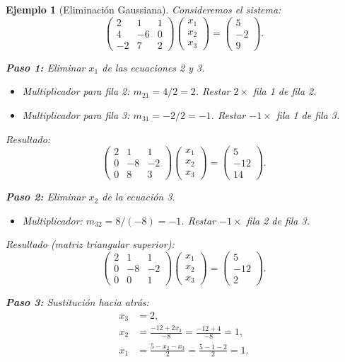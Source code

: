 \documentclass[a4paper,11pt]{report}
\newtheorem{example}[theorem]{Ejemplo}
\begin{document}
\begin{example}[Eliminación Gaussiana]
Consideremos el sistema:
\[
\begin{pmatrix}
2 & 1 & 1 \\
4 & -6 & 0 \\
-2 & 7 & 2
\end{pmatrix}
\begin{pmatrix} x_1 \\ x_2 \\ x_3 \end{pmatrix}
=
\begin{pmatrix} 5 \\ -2 \\ 9 \end{pmatrix}.
\]

\textbf{Paso 1:} Eliminar $x_1$ de las ecuaciones 2 y 3.
\begin{itemize}
\item Multiplicador para fila 2: $m_{21} = 4/2 = 2$. Restar $2 \times$ fila 1 de fila 2.
\item Multiplicador para fila 3: $m_{31} = -2/2 = -1$. Restar $-1 \times$ fila 1 de fila 3.
\end{itemize}
Resultado:
\[
\begin{pmatrix}
2 & 1 & 1 \\
0 & -8 & -2 \\
0 & 8 & 3
\end{pmatrix}
\begin{pmatrix} x_1 \\ x_2 \\ x_3 \end{pmatrix}
=
\begin{pmatrix} 5 \\ -12 \\ 14 \end{pmatrix}.
\]

\textbf{Paso 2:} Eliminar $x_2$ de la ecuación 3.
\begin{itemize}
\item Multiplicador: $m_{32} = 8/(-8) = -1$. Restar $-1 \times$ fila 2 de fila 3.
\end{itemize}
Resultado (matriz triangular superior):
\[
\begin{pmatrix}
2 & 1 & 1 \\
0 & -8 & -2 \\
0 & 0 & 1
\end{pmatrix}
\begin{pmatrix} x_1 \\ x_2 \\ x_3 \end{pmatrix}
=
\begin{pmatrix} 5 \\ -12 \\ 2 \end{pmatrix}.
\]

\textbf{Paso 3:} Sustitución hacia atrás:
\begin{align*}
x_3 &= 2, \\
x_2 &= \frac{-12 + 2x_3}{-8} = \frac{-12 + 4}{-8} = 1, \\
x_1 &= \frac{5 - x_2 - x_3}{2} = \frac{5 - 1 - 2}{2} = 1.
\end{align*}
\end{example}
\end{document}
